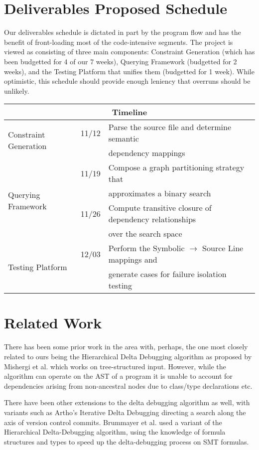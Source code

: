 \documentclass[11pt]{article}
\begin{document}
\section{Deliverables Proposed Schedule}
Our deliverables schedule is dictated in part by the program flow and has the
benefit of front-loading most of the code-intensive segments. The project is
viewed as consisting of three main components: Constraint Generation (which has
been budgetted for 4 of our 7 weeks), Querying Framework (budgetted for 2
weeks), and the Testing Platform that unifies them (budgetted for 1 week). While
optimistic, this schedule should provide enough leniency that overruns should
be unlikely.

\begin{tabular}{|l|l|l|}
\hline
\multicolumn{3}{|c|}{Timeline} \\
\hline
\multirow{2}{*}{Constraint Generation} & 11/12 &
Parse the source file and determine semantic \\
 & & dependency mappings \\ \hline
\multirow{4}{*}{Querying Framework} & 11/19 & Compose a graph partitioning
strategy that \\
 & & approximates a binary search \\
 & 11/26 & Compute transitive closure of dependency relationships \\
 & & over the search space \\ \hline
\multirow{2}{*}{Testing Platform} & 12/03 & Perform the Symbolic $\rightarrow$
Source Line mappings and \\
 & & generate cases for failure isolation testing \\ \hline
\end{tabular}



\section{Related Work}
There has been some prior work in the area with, perhaps, the one most closely
related to ours being the Hierarchical Delta Debugging algorithm as proposed by
Mishergi et al. \cite{hdd} which works on tree-structured input. However,
while the algorithm can operate on the AST of a program it is unable to
account for dependencies arising from non-ancestral nodes due to class/type
declarations etc.

There have been other extensions to the delta debugging algorithm as well, with
variants such as Artho's Iterative Delta Debugging \cite{idd} directing a search
along the axis of version control commits. Brummayer et al. \cite{smt} used a 
variant of the Hierarchical Delta-Debugging algorithm, using the knowledge of 
formula structures and types to speed up the delta-debugging process on SMT 
formulas.
\end{document}
